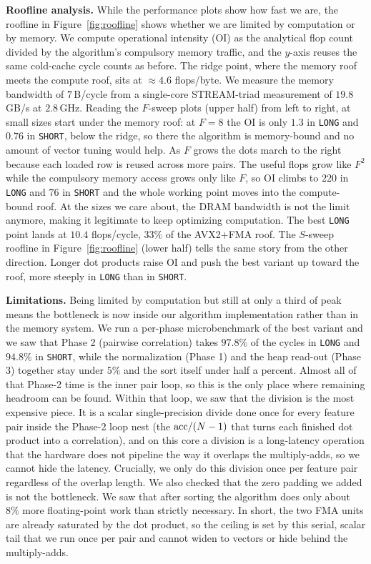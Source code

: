 \documentclass[letterpaper]{article}
\newcommand{\mypar}[1]{{\bf #1.}}
\begin{document}
\mypar{Roofline analysis}
While the performance plots show how fast we are, the roofline in Figure~\ref{fig:roofline} shows whether we are limited by computation or by memory. We compute operational intensity (OI) as the analytical flop count divided by the algorithm's compulsory memory traffic, and the $y$-axis reuses the same cold-cache cycle counts as before. The ridge point, where the memory roof meets the compute roof, sits at $\approx4.6$ flops/byte. We measure the memory bandwidth of $7$\,B/cycle from a single-core STREAM-triad measurement of $19.8$\,GB/s at $2.8$\,GHz. Reading the $F$-sweep plots (upper half) from left to right, at small sizes start under the memory roof: at $F=8$ the OI is only $1.3$ in \texttt{LONG} and $0.76$ in \texttt{SHORT}, below the ridge, so there the algorithm is memory-bound and no amount of vector tuning would help. As $F$ grows the dots march to the right because each loaded row is reused across more pairs. The useful flops grow like $F^2$ while the compulsory memory access grows only like $F$, so OI climbs to $220$ in \texttt{LONG} and $76$ in \texttt{SHORT} and the whole working point moves into the compute-bound roof. At the sizes we care about, the DRAM bandwidth is not the limit anymore, making it legitimate to keep optimizing computation. The best \texttt{LONG} point lands at $10.4$ flops/cycle, $33\%$ of the AVX2+FMA roof. The $S$-sweep roofline in Figure~\ref{fig:roofline} (lower half) tells the same story from the other direction. Longer dot products raise OI and push the best variant up toward the roof, more steeply in \texttt{LONG} than in \texttt{SHORT}.

\mypar{Limitations}
Being limited by computation but still at only a third of peak means the bottleneck is now inside our algorithm implementation rather than in the memory system. We run a per-phase microbenchmark of the best variant and we saw that Phase 2 (pairwise correlation) takes $97.8\%$ of the cycles in \texttt{LONG} and $94.8\%$ in \texttt{SHORT}, while the normalization (Phase 1) and the heap read-out (Phase 3) together stay under $5\%$ and the sort itself under half a percent. Almost all of that Phase-2 time is the inner pair loop, so this is the only place where remaining headroom can be found. Within that loop, we saw that the division is the most expensive piece. It is a scalar single-precision divide done once for every feature pair inside the Phase-2 loop nest (the $\textnormal{acc}/(N-1)$ that turns each finished dot product into a correlation), and on this core a division is a long-latency operation that the hardware does not pipeline the way it overlaps the multiply-adds, so we cannot hide the latency. Crucially, we only do this division once per feature pair regardless of the overlap length. We also checked that the zero padding we added is not the bottleneck. We saw that after sorting the algorithm does only about $8\%$ more floating-point work than strictly necessary. In short, the two FMA units are already saturated by the dot product, so the ceiling is set by this serial, scalar tail that we run once per pair and cannot widen to vectors or hide behind the multiply-adds.
\end{document}
